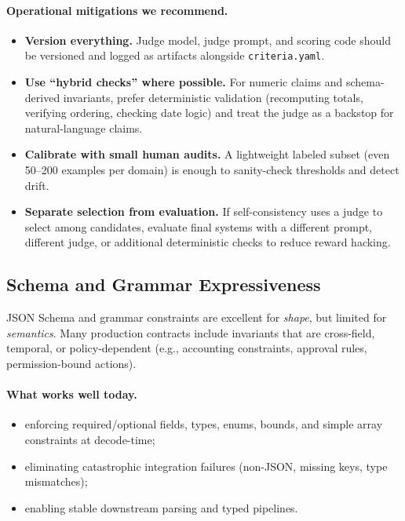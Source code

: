 \documentclass[11pt]{article}
\begin{document}
\paragraph{Operational mitigations we recommend.}
\begin{itemize}[leftmargin=12pt]
    \item \textbf{Version everything.}
    Judge model, judge prompt, and scoring code should be versioned and logged as artifacts alongside \texttt{criteria.yaml}.

    \item \textbf{Use ``hybrid checks'' where possible.}
    For numeric claims and schema-derived invariants, prefer deterministic validation (recomputing totals, verifying ordering, checking date logic) and treat the judge as a backstop for natural-language claims.

    \item \textbf{Calibrate with small human audits.}
    A lightweight labeled subset (even 50--200 examples per domain) is enough to sanity-check thresholds and detect drift.

    \item \textbf{Separate selection from evaluation.}
    If self-consistency uses a judge to select among candidates, evaluate final systems with a different prompt, different judge, or additional deterministic checks to reduce reward hacking.
\end{itemize}

\subsection{Schema and Grammar Expressiveness}

JSON Schema and grammar constraints are excellent for \emph{shape}, but limited for \emph{semantics}.
Many production contracts include invariants that are cross-field, temporal, or policy-dependent (e.g., accounting constraints, approval rules, permission-bound actions).

\paragraph{What works well today.}
\begin{itemize}[leftmargin=12pt]
    \item enforcing required/optional fields, types, enums, bounds, and simple array constraints at decode-time;
    \item eliminating catastrophic integration failures (non-JSON, missing keys, type mismatches);
    \item enabling stable downstream parsing and typed pipelines.
\end{itemize}
\end{document}
